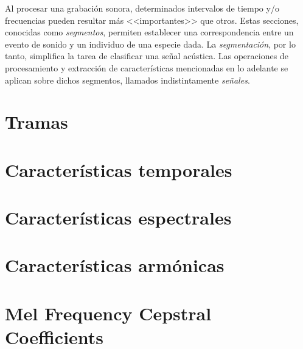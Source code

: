 Al procesar una grabación sonora, determinados intervalos de tiempo y/o frecuencias pueden resultar más <<importantes>> que otros.
Estas secciones, conocidas como \textit{segmentos}, permiten establecer una correspondencia entre un evento de sonido y un individuo de una especie dada.
La \textit{segmentación}, por lo tanto, simplifica la tarea de clasificar una señal acústica.
Las operaciones de procesamiento y extracción de características mencionadas en lo adelante se aplican sobre dichos segmentos, llamados indistintamente \textit{señales}.

\section{Tramas}\label{sec:frames}


\section{Características temporales}\label{sec:característicasTemporales}


\section{Características espectrales}\label{sec:característicasEspectrales}


\section{Características armónicas}\label{sec:característicasArmónicas}


\section{Mel Frequency Cepstral Coefficients}\label{sec:MFCC}






